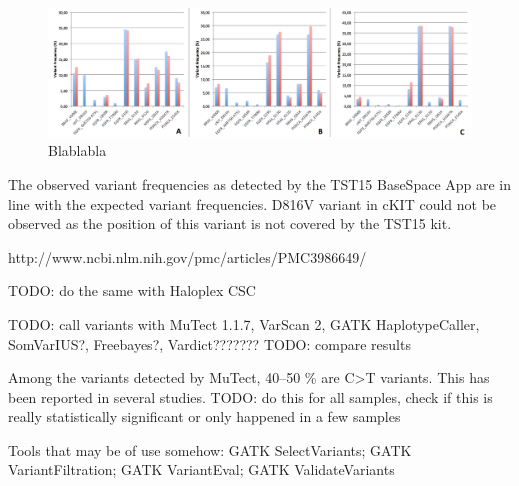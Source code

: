 \begin{figure}[!htbp]
  \begin{center}
    \includegraphics[scale=0.5,angle=0]{var_freqs.png}
    \caption{Blablabla}
  \end{center}
\end{figure}

The observed variant frequencies as detected by the TST15 BaseSpace App are
in line with the expected variant frequencies. D816V variant in cKIT could
not be observed as the position of this variant is not covered by the TST15 kit.

http://www.ncbi.nlm.nih.gov/pmc/articles/PMC3986649/

TODO: do the same with Haloplex CSC

TODO: call variants with MuTect 1.1.7, VarScan 2, GATK HaplotypeCaller, SomVarIUS?, Freebayes?, Vardict???????
TODO: compare results

Among the variants detected by MuTect, 40--50 \% are C>T variants. This has been reported in several studies.
TODO: do this for all samples, check if this is really statistically significant or only happened in a few samples

Tools that may be of use somehow: GATK SelectVariants; GATK VariantFiltration; GATK VariantEval; GATK ValidateVariants
